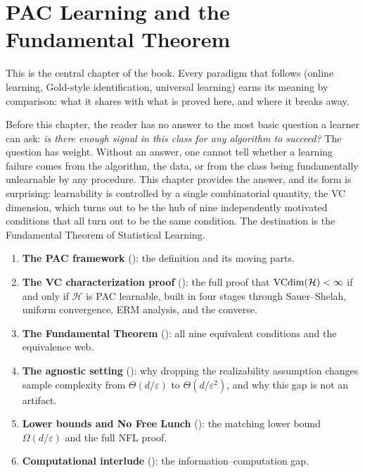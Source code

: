 
\chapter{PAC Learning and the Fundamental Theorem}
\label{ch:pac}

This is the central chapter of the book.  Every paradigm that follows (online
learning, Gold-style identification, universal learning) earns its meaning by
comparison: what it shares with what is proved here, and where it breaks away.

Before this chapter, the reader has no answer to the most basic question a
learner can ask: \emph{is there enough signal in this class for any algorithm
to succeed?}  The question has weight.  Without an answer, one cannot tell
whether a learning failure comes from the algorithm, the data, or from the
class being fundamentally unlearnable by any procedure.  This chapter provides
the answer, and its form is surprising: learnability is controlled by a single
combinatorial quantity, the VC dimension, which turns out to be the hub of nine
independently motivated conditions that all turn out to be the same condition.
The destination is the Fundamental Theorem of Statistical Learning.

\medskip

\begin{enumerate}[leftmargin=*,itemsep=2pt]
\item \textbf{The PAC framework} (): the definition and its
  moving parts.
\item \textbf{The VC characterization proof} (): the full
  proof that $\mathrm{VCdim}(\mathcal{H}) < \infty$ if and only if $\mathcal{H}$ is PAC
  learnable, built in four stages through Sauer--Shelah, uniform convergence,
  ERM analysis, and the converse.
\item \textbf{The Fundamental Theorem} (): all nine
  equivalent conditions and the equivalence web.
\item \textbf{The agnostic setting} (): why dropping the
  realizability assumption changes sample complexity from $\Theta(d/\varepsilon)$
  to $\Theta(d/\varepsilon^2)$, and why this gap is not an artifact.
\item \textbf{Lower bounds and No Free Lunch} (): the
  matching lower bound $\Omega(d/\varepsilon)$ and the full NFL proof.
\item \textbf{Computational interlude} (): the
  information--computation gap.
\end{enumerate}


